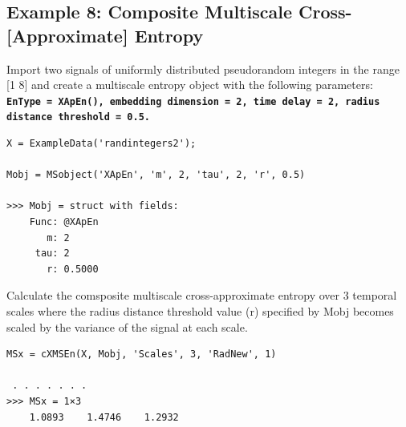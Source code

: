 \documentclass[12pt, a4paper, titlepage, openany]{book}
\begin{document}
\subsection{\normalsize Example 8: \hspace{15mm}Composite Multiscale Cross-[Approximate] Entropy}
\noindent Import two signals of uniformly distributed pseudorandom integers in the range [1 8] and create a multiscale entropy object with the following parameters:\\
\texttt{\textbf{EnType =  XApEn(), embedding dimension = 2, time delay = 2, radius distance threshold = 0.5.}}
\begin{verbatim}
X = ExampleData('randintegers2');

Mobj = MSobject('XApEn', 'm', 2, 'tau', 2, 'r', 0.5)

>>> Mobj = struct with fields:
    Func: @XApEn
       m: 2
     tau: 2
       r: 0.5000
\end{verbatim}
Calculate the comsposite multiscale cross-approximate entropy over 3 temporal scales where the radius distance threshold value (r) specified by Mobj becomes scaled by the variance of the signal at each scale.
\begin{verbatim}
MSx = cXMSEn(X, Mobj, 'Scales', 3, 'RadNew', 1)

 . . . . . . .
>>> MSx = 1×3
    1.0893    1.4746    1.2932
\end{verbatim}




\newpage
\end{document}

